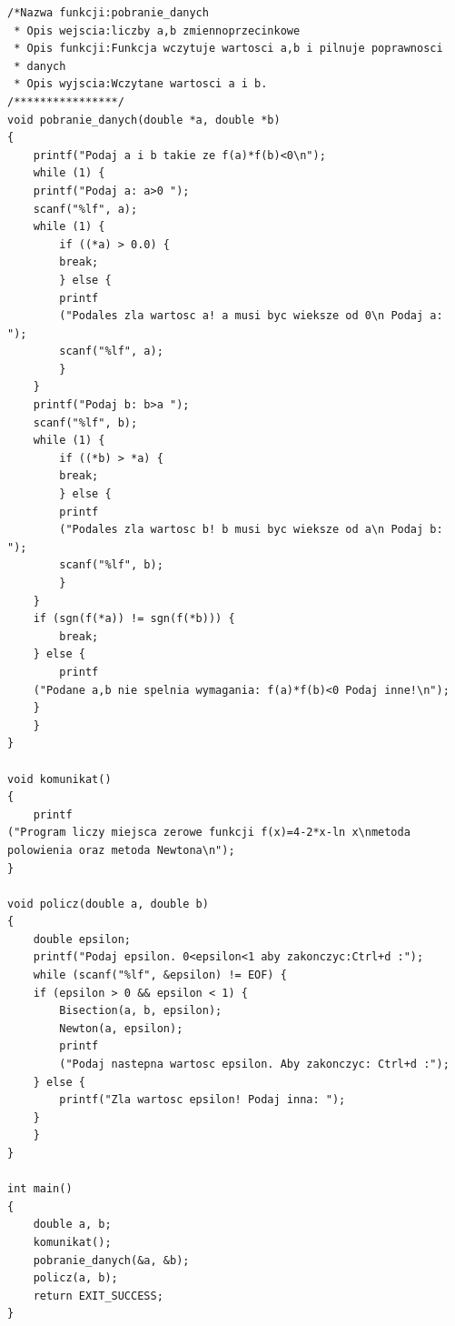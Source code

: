 \documentclass[11pt]{article} %
\begin{document}
\begin{lstlisting}
/*Nazwa funkcji:pobranie_danych
 * Opis wejscia:liczby a,b zmiennoprzecinkowe 
 * Opis funkcji:Funkcja wczytuje wartosci a,b i pilnuje poprawnosci
 * danych
 * Opis wyjscia:Wczytane wartosci a i b.
/****************/
void pobranie_danych(double *a, double *b)
{
    printf("Podaj a i b takie ze f(a)*f(b)<0\n");
    while (1) {
	printf("Podaj a: a>0 ");
	scanf("%lf", a);
	while (1) {
	    if ((*a) > 0.0) {
		break;
	    } else {
		printf
	    ("Podales zla wartosc a! a musi byc wieksze od 0\n Podaj a: ");
		scanf("%lf", a);
	    }
	}
	printf("Podaj b: b>a ");
	scanf("%lf", b);
	while (1) {
	    if ((*b) > *a) {
		break;
	    } else {
		printf
	    ("Podales zla wartosc b! b musi byc wieksze od a\n Podaj b: ");
		scanf("%lf", b);
	    }
	}
	if (sgn(f(*a)) != sgn(f(*b))) {
	    break;
	} else {
	    printf
	("Podane a,b nie spelnia wymagania: f(a)*f(b)<0 Podaj inne!\n");
	}
    }
}

void komunikat()
{
    printf
("Program liczy miejsca zerowe funkcji f(x)=4-2*x-ln x\nmetoda polowienia oraz metoda Newtona\n");
}

void policz(double a, double b)
{
    double epsilon;
    printf("Podaj epsilon. 0<epsilon<1 aby zakonczyc:Ctrl+d :");
    while (scanf("%lf", &epsilon) != EOF) {
	if (epsilon > 0 && epsilon < 1) {
	    Bisection(a, b, epsilon);
	    Newton(a, epsilon);
	    printf
		("Podaj nastepna wartosc epsilon. Aby zakonczyc: Ctrl+d :");
	} else {
	    printf("Zla wartosc epsilon! Podaj inna: ");
	}
    }
}

int main()
{
    double a, b;
    komunikat();
    pobranie_danych(&a, &b);
    policz(a, b);
    return EXIT_SUCCESS;
}

\end{lstlisting}
\end{document}
